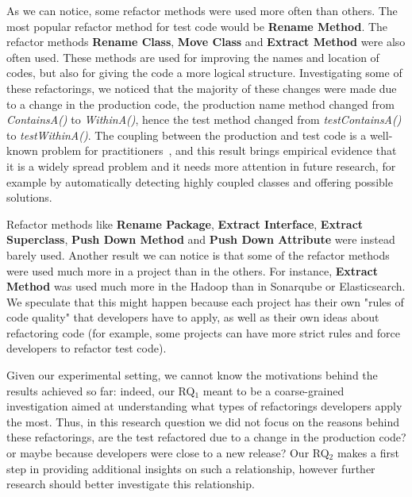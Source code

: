 As we can notice, some refactor methods were used more often than others. The most popular refactor method for test code would be \textbf{Rename Method}. The refactor methods \textbf{Rename Class}, \textbf{Move Class} and \textbf{Extract Method} were also often used. These methods are used for improving the names and location of codes, but also for giving the code a more logical structure. Investigating some of these refactorings, we noticed that the majority of these changes were made due to a change in the production code, \eg the production name method changed from \emph{ContainsA()} to \emph{WithinA()}, hence the test method changed from \emph{testContainsA()} to \emph{testWithinA()}. The coupling between the production and test code is a well-known problem for practitioners~\cite{herman,eric}, and this result brings empirical evidence that it is a widely spread problem and it needs more attention in future research, for example by automatically detecting highly coupled classes and offering possible solutions.

Refactor methods like \textbf{Rename Package}, \textbf{Extract Interface}, \textbf{Extract Superclass}, \textbf{Push Down Method} and \textbf{Push Down Attribute} were instead barely used. Another result we can notice is that some of the refactor methods were used much more in a project than in the others. For instance, \textbf{Extract Method} was used much more in the Hadoop than in Sonarqube or Elasticsearch. We speculate that this might happen because each project has their own "rules of code quality" that developers have to apply, as well as their own ideas about refactoring code (for example, some projects can have more strict rules and force developers to refactor test code).

Given our experimental setting, we cannot know the motivations behind the results achieved so far: indeed, our RQ$_1$ meant to be a coarse-grained investigation aimed at understanding what types of refactorings developers apply the most. Thus, in this research question we did not focus on the reasons behind these refactorings, \eg are the test refactored due to a change in the production code? or maybe because developers were close to a new release? Our RQ$_2$ makes a first step in providing additional insights on such a relationship, however further research should better investigate this relationship.


